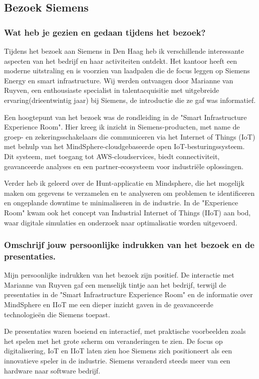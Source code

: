\subsection{Bezoek Siemens}
\subsubsection{Wat heb je gezien en gedaan tijdens het bezoek?}

Tijdens het bezoek aan Siemens in Den Haag heb ik verschillende interessante aspecten van het bedrijf en haar activiteiten ontdekt. Het kantoor heeft een moderne uitstraling en is voorzien van laadpalen die de focus leggen op Siemens Energy en smart infrastructure. Wij werden ontvangen door Marianne van Ruyven, een enthousiaste specialist in talentacquisitie met uitgebreide ervaring(drieentwintig jaar) bij Siemens, de introductie die ze gaf was informatief.

Een hoogtepunt van het bezoek was de rondleiding in de "Smart Infrastructure Experience Room". Hier kreeg ik inzicht in Siemens-producten, met name de groep- en zekeringsschakelaars die communiceren via het Internet of Things (IoT) met behulp van het MindSphere-cloudgebaseerde open IoT-besturingssysteem. Dit systeem, met toegang tot AWS-cloudservices, biedt connectiviteit, geavanceerde analyses en een partner-ecosysteem voor industriële oplossingen.

Verder heb ik geleerd over de Hunt-applicatie en Mindsphere, die het mogelijk maken om gegevens te verzamelen en te analyseren om problemen te identificeren en ongeplande downtime te minimaliseren in de industrie. In de "Experience Room" kwam ook het concept van Industrial Internet of Things (IIoT) aan bod, waar digitale simulaties en onderzoek naar optimalisatie worden uitgevoerd.

\subsubsection{Omschrijf jouw persoonlijke indrukken van het bezoek en de presentaties.}

Mijn persoonlijke indrukken van het bezoek zijn positief. De interactie met Marianne van Ruyven gaf een menselijk tintje aan het bedrijf, terwijl de presentaties in de "Smart Infrastructure Experience Room" en de informatie over MindSphere en IIoT me een dieper inzicht gaven in de geavanceerde technologieën die Siemens toepast.

De presentaties waren boeiend en interactief, met praktische voorbeelden zoals het spelen met het grote scherm om veranderingen te zien. De focus op digitalisering, IoT en IIoT laten zien hoe Siemens zich positioneert als een innovatieve speler in de industrie. Siemens veranderd steeds meer van een hardware naar software bedrijf.

